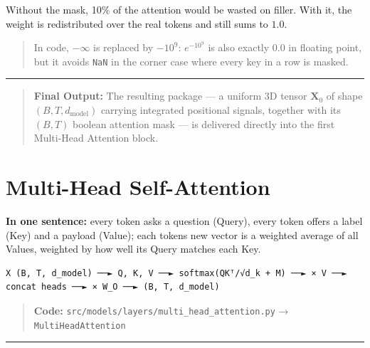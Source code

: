 \documentclass[11pt,a4paper,oneside]{report}
\begin{document}
Without the mask, 10\% of the attention would be wasted on filler. With it, the weight is redistributed over the real tokens and still sums to \(1.0\).

\begin{quote}
In code, \(-\infty\) is replaced by \(-10^9\): \(e^{-10^9}\) is also exactly \(0.0\) in floating point, but it avoids \texttt{NaN} in the corner case where every key in a row is masked.
\end{quote}

\begin{center}\rule{0.5\linewidth}{0.5pt}\end{center}

\begin{quote}
\textbf{Final Output:} The resulting package --- a uniform 3D tensor \(\mathbf{X}_0\) of shape \((B, T, d_{\text{model}})\) carrying integrated positional signals, together with its \((B, T)\) boolean attention mask --- is delivered directly into the first Multi-Head Attention block.
\end{quote}




\chapter{Multi-Head Self-Attention}\label{multi-head-self-attention}

\textbf{In one sentence:} every token asks a question (Query), every token offers a label (Key) and a payload (Value); each token\textquotesingle s new vector is a weighted average of all Values, weighted by how well its Query matches each Key.

\begin{Verbatim}[fontsize=\scriptsize]
X (B, T, d_model) ──► Q, K, V ──► softmax(QKᵀ/√d_k + M) ──► × V ──► concat heads ──► × W_O ──► (B, T, d_model)
\end{Verbatim}

\begin{quote}
\textbf{Code:} \texttt{src/\allowbreak{}models/\allowbreak{}layers/\allowbreak{}multi\_\allowbreak{}head\_\allowbreak{}attention.\allowbreak{}py} → \texttt{MultiHeadAttention}
\end{quote}

\begin{center}\rule{0.5\linewidth}{0.5pt}\end{center}
\end{document}
